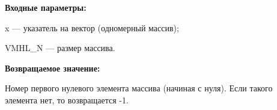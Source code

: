 \textbf{Входные параметры:}

 x --- указатель на вектор (одномерный массив);
 
 VMHL\_N --- размер массива.

\textbf{Возвращаемое значение:}

 Номер первого нулевого элемента массива (начиная с нуля). Если такого элемента нет, то возвращается -1.